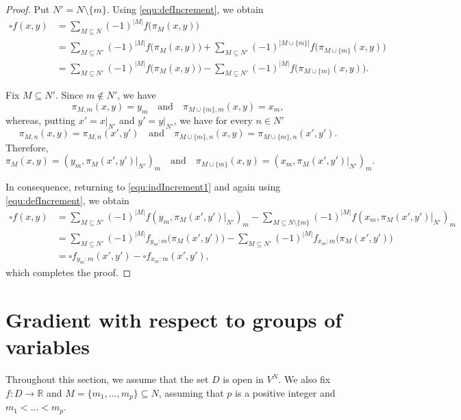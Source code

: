 \documentclass{amsart}
\theoremstyle{plain}%
\theoremstyle{definition}
\theoremstyle{remark}
\begin{document}
\begin{proof} 
Put $N'=N\setminus\{m\}$. Using \eqref{equ:defIncrement}, we obtain
\begin{equation}\label{equ:indIncrement1}
\begin{split}
\square f(x,y)&=\sum_{M\subseteq N}(-1)^{|M|}f\big(\pi_M(x,y)\big)\\
&=\sum_{M\subseteq N'}(-1)^{|M|}f\big(\pi_M(x,y)\big)
+\sum_{M\subseteq N'}(-1)^{|M\cup\{m\}|}f\big(\pi_{M\cup\{m\}}(x,y)\big)\\ 
&=\sum_{M\subseteq N'}(-1)^{|M|}f\big(\pi_M(x,y)\big)
-\sum_{M\subseteq N'}(-1)^{|M|}f\big(\pi_{M\cup\{m\}}(x,y)\big).
\end{split}
\end{equation}

Fix $M\subseteq N'$. Since $m\notin N'$, we have 
\begin{equation*}
\pi_{M,m}(x,y)=y_m\quad\text{and}\quad \pi_{M\cup\{m\},m}(x,y)=x_m,
\end{equation*}
whereas, putting $x'=x|_{N'}$ and $y'=y|_{N'}$, we have for every $n\in N'$
\begin{equation*}
\pi_{M,n}(x,y)=\pi_{M,n}(x',y')\quad\text{and}
\quad\pi_{M\cup \{m\},n}(x,y)=\pi_{M\cup\{m\},n}(x',y').
\end{equation*}
Therefore,
\begin{equation*}
\pi_M(x,y)=(y_m,\pi_M(x',y')|_{N'})_m\quad\text{and}\quad 
\pi_{M\cup\{m\}}(x,y)=(x_m,\pi_M(x',y')|_{N'})_m.
\end{equation*}

In consequence, returning to \eqref{equ:indIncrement1} and again using \eqref{equ:defIncrement}, we obtain
\begin{align*}
\square f(x,y)&=\sum_{M\subseteq N'}\!(-1)^{|M|}f(y_m,\pi_M(x',y')|_{N'})_m
-\!\!\!\!\!\!\!\!\!\sum_{M\subseteq N\setminus \{m\}}\!\!\!\!\!\!(-1)^{|M|}f(x_m,\pi_M(x',y')|_{N'})_m\\
&=\sum_{M\subseteq N'}(-1)^{|M|}f_{y_m:m}\big(\pi_M(x',y')\big) 
-\sum_{M\subseteq N'}(-1)^{|M|}f_{x_m:m}\big(\pi_M(x',y')\big)\\
&=\square f_{y_m:m}(x',y')-\square f_{x_m:m}(x',y'),
\end{align*}
which completes the proof. 
\end{proof}



\section{Gradient with respect to groups of variables}\label{section4}
Throughout this section, we assume that the set $D$ is open in $V^N$. We also fix $f\colon D\to\mathbb{R}$ and $M=\{m_1,\dots,m_p\}\subseteq N$, assuming that $p$ is a positive integer and $m_1<\dots<m_p$.
\end{document}
